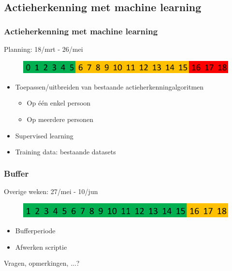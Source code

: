 \documentclass[]{beamer}
\begin{document}
	\subsection{Actieherkenning met machine learning}
		\begin{frame}
		\frametitle{Actieherkenning met machine learning}
		Planning: 18/mrt - 26/mei
		\begin{figure}
		\includegraphics[width=\textwidth]{actieherkenning}
		\end{figure}
		\begin{itemize}
			\item<1- > Toepassen/uitbreiden van bestaande actieherkenningalgoritmen
			\begin{itemize}
				\item Op één enkel persoon
				\item Op meerdere personen
			\end{itemize}
			\item<2- > Supervised learning
			\item<3- > Training data: bestaande datasets
		\end{itemize}
	\end{frame}
	
	\begin{frame}
	\frametitle{Buffer}
	Overige weken: 27/mei - 10/jun
	\begin{figure}
		\includegraphics[width=\textwidth]{buffer}
	\end{figure}
	\begin{itemize}
	\item Bufferperiode
	\item Afwerken scriptie
	\end{itemize}
	\end{frame}
	
	\begin{frame}
		\begin{center}
			\Huge Vragen, opmerkingen, ...?
		\end{center}
	\end{frame}
\end{document}
